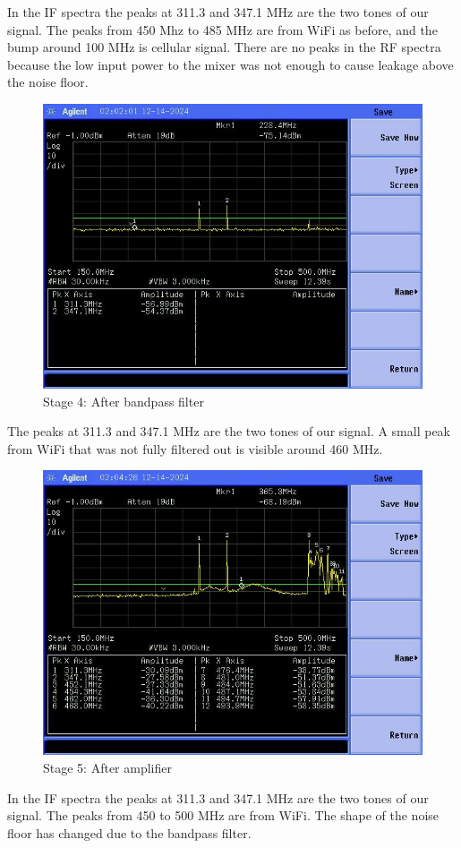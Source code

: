 \documentclass[letterpaper,12pt]{article}
\begin{document}
\noindent
In the IF spectra the peaks at 311.3 and 347.1 MHz are the two tones of our signal. The peaks from 450 Mhz to 485 MHz are from WiFi as before, and the bump around 100 MHz is cellular signal. There are no peaks in the RF spectra because the low input power to the mixer was not enough to cause leakage above the noise floor.
\begin{figure}[H]
	\begin{centering}
		\includegraphics[width=0.5\columnwidth]{figures/receiver_spectra/4.bpf}
		\caption{Stage 4: After bandpass filter}
	\end{centering}
\end{figure}
\noindent
The peaks at 311.3 and 347.1 MHz are the two tones of our signal. A small peak from WiFi that was not fully filtered out is visible around 460 MHz.

\begin{figure}[H]
	\begin{centering}
		\includegraphics[width=0.5\columnwidth]{figures/receiver_spectra/5.amp}
		\caption{Stage 5: After amplifier}
	\end{centering}
\end{figure}
\noindent
In the IF spectra the peaks at 311.3 and 347.1 MHz are the two tones of our signal. The peaks from 450 to 500 MHz are from WiFi. The shape of the noise floor has changed due to the bandpass filter.
\end{document}
